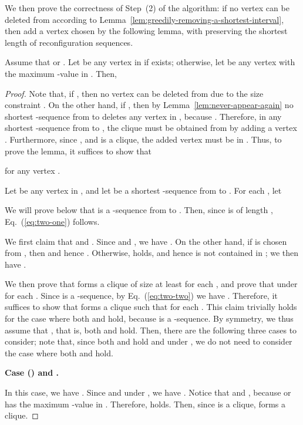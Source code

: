 \documentclass{llncs}
\newcounter{one}
\newcommand{\one}{{\rm \roman{one}}}
\newcounter{two}
\newcounter{three}
\begin{document}
	We then prove the correctness of Step~(2) of the algorithm:
if no vertex can be deleted from  according to Lemma~\ref{lem:greedily-removing-a-shortest-interval}, then add a vertex  chosen by the following lemma, with preserving the shortest length of reconfiguration sequences.
	\begin{lemma} \label{lem:greedily-taking-a-longest-interval}
	Assume that  or .
	Let  be any vertex in  if exists{\rm ;} 
otherwise, let  be any vertex with the maximum -value in .
	Then,
	
	\end{lemma}
	\begin{proof}
	Note that, if , then no vertex can be deleted from  due to the size constraint .
	On the other hand, if , then by Lemma~\ref{lem:never-appear-again} no shortest -sequence from  to  deletes any vertex  in , because .
	Therefore, in any shortest -sequence  from  to , the clique  must be obtained from  by adding a vertex .
	Furthermore, since ,  and  is a clique, the added vertex  must be in . 
	Thus, to prove the lemma, it suffices to show that
	
for any vertex . 

	Let   be any vertex in , and let  be a shortest -sequence from  to .
	For each , let 
	
	We will prove below that  is a -sequence from  to .
	Then, since  is of length , Eq.~(\ref{eq:two-one}) follows. 
	
	We first claim that  and . 
	Since  and , we have . 
	On the other hand, if  is chosen from , then  and hence .
	Otherwise,  holds, and hence  is not contained in ;
we then have .

	We then prove that  forms a clique of size at least  for each , and prove that  under  for each . 
	Since  is a -sequence, by Eq.~(\ref{eq:two-two}) we have . 
	Therefore, it suffices to show that  forms a clique such that  for each .
	This claim trivially holds for the case where both  and  hold, because  is a -sequence.
	By symmetry, we thus assume that , that is, both  and  hold.
	Then, there are the following three cases to consider;
note that, since both  and  hold and  under , we do not need to consider the case where both  and  hold.
\medskip

\noindent
	{\bf Case (\one)  and .}
	
	In this case, we have . 
	Since  and  under , we have .
	Notice that  and , because  or  has the maximum -value in . 
	Therefore,  holds.
	Then, since  is a clique,  forms a clique.
\medskip


\end{proof}
\end{document}
